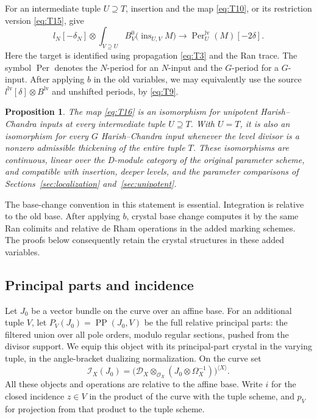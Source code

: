 \documentclass[11pt]{article}
\numberwithin{equation}{section}
\newtheorem{proposition}[theorem]{Proposition}
\theoremstyle{definition}
\theoremstyle{remark}
\begin{document}
For an intermediate tuple $U\supseteq T$, insertion and the map
\eqref{eq:T10}, or its restriction version \eqref{eq:T15}, give
\begin{equation}\label{eq:T16}
 l_N[-\delta_N]\otimes
 \int_{V\supseteq U} B^0_V\bigl(\operatorname{ins}_{U,V}M\bigr)
 \longrightarrow \operatorname{Per}^{\mathrm{lv}}_U(M)[-2\delta].
\end{equation}
Here the target is identified using propagation \eqref{eq:T3} and the Ran
trace.  The symbol $\operatorname{Per}$ denotes the $N$-period for an
$N$-input and the $G$-period for a $G$-input.  After applying $b$ in the old variables, we
may equivalently use the source
$l^{\mathrm{lv}}[\delta]\otimes B^{\mathrm{lv}}$ and unshifted periods,
by \eqref{eq:T9}.

\begin{proposition}\label{prop:ran-integrated-period}
The map \eqref{eq:T16} is an isomorphism for unipotent Harish--Chandra
inputs at every intermediate tuple $U\supseteq T$.  With $U=T$, it is
also an isomorphism for every $G$ Harish--Chandra input whenever the
level divisor is a nonzero admissible thickening of the entire tuple $T$.
These isomorphisms are
continuous, linear over the D-module category of the original parameter
scheme, and compatible with insertion, deeper levels, and the parameter
comparisons of Sections~\ref{sec:localization} and~\ref{sec:unipotent}.
\end{proposition}

The base-change convention in this statement is essential.  Integration is
relative to the old base.  After applying $b$, crystal base change computes it
by the same Ran colimits and relative de Rham operations in the added
marking schemes.  The proofs below consequently retain the crystal
structures in these added variables.

\subsection{Principal parts and incidence}

Let $J_0$ be a vector bundle on the curve over an affine base.  For an
additional tuple $V$, let $P_V(J_0)=\operatorname{PP}(J_0,V)$ be the full
relative principal parts: the filtered union over all pole orders, modulo
regular sections, pushed from the divisor support.  We equip this object
with its principal-part crystal in the varying tuple, in the
angle-bracket dualizing normalization.  On the curve set
\[
 \mathcal I_X(J_0)=
 \bigl(\mathscr D_X\otimes_{\mathcal O_X}
               (J_0\otimes\Omega_X^{-1})\bigr)^{\langle X\rangle}.
\]
All these objects and operations are relative to the affine base.  Write
$i$ for the closed incidence $z\in V$ in the product of the curve with the
tuple scheme, and $p_V$ for projection from that product to the tuple
scheme.
\end{document}
